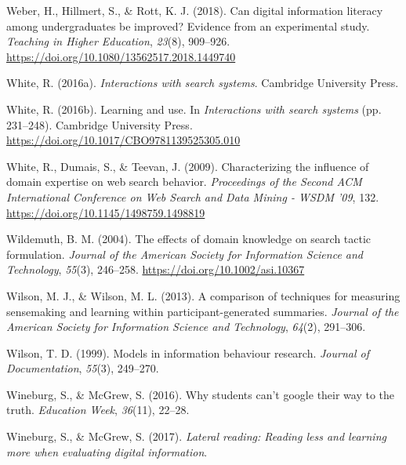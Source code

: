 \documentclass[letterpaper, nobind]{templates/ociamthesis}
\newlength{\cslhangindent}
\newenvironment{CSLReferences}[2] %
 {%
  \setlength{\parindent}{0pt}
  \ifodd #1
  \let\oldpar\par
  \def\par{\hangindent=\cslhangindent\oldpar}
  \fi
  \setlength{\parskip}{1mm}
  \setlength{\baselineskip}{6mm}
 }%
 {}
\begin{document}
\begin{CSLReferences}{1}{0}
\leavevmode{}%
Weber, H., Hillmert, S., \& Rott, K. J. (2018). Can digital information literacy among undergraduates be improved? Evidence from an experimental study. \emph{Teaching in Higher Education}, \emph{23}(8), 909--926. \url{https://doi.org/10.1080/13562517.2018.1449740}

\leavevmode{}%
White, R. (2016a). \emph{Interactions with search systems}. Cambridge University Press.

\leavevmode{}%
White, R. (2016b). Learning and use. In \emph{Interactions with search systems} (pp. 231--248). {Cambridge University Press}. \url{https://doi.org/10.1017/CBO9781139525305.010}

\leavevmode{}%
White, R., Dumais, S., \& Teevan, J. (2009). Characterizing the influence of domain expertise on web search behavior. \emph{Proceedings of the {Second ACM International Conference} on {Web Search} and {Data Mining} - {WSDM} '09}, 132. \url{https://doi.org/10.1145/1498759.1498819}

\leavevmode{}%
Wildemuth, B. M. (2004). The effects of domain knowledge on search tactic formulation. \emph{Journal of the American Society for Information Science and Technology}, \emph{55}(3), 246--258. \url{https://doi.org/10.1002/asi.10367}

\leavevmode{}%
Wilson, M. J., \& Wilson, M. L. (2013). A comparison of techniques for measuring sensemaking and learning within participant-generated summaries. \emph{Journal of the American Society for Information Science and Technology}, \emph{64}(2), 291--306.

\leavevmode{}%
Wilson, T. D. (1999). Models in information behaviour research. \emph{Journal of Documentation}, \emph{55}(3), 249--270.

\leavevmode{}%
Wineburg, S., \& McGrew, S. (2016). Why students can't google their way to the truth. \emph{Education Week}, \emph{36}(11), 22--28.

\leavevmode{}%
Wineburg, S., \& McGrew, S. (2017). \emph{Lateral reading: Reading less and learning more when evaluating digital information}.


\end{CSLReferences}
\end{document}

